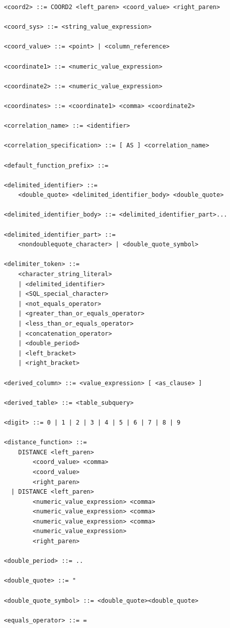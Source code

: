 \documentclass[11pt,a4paper]{ivoa}
\begin{document}
\begin{verbatim}
    <coord2> ::= COORD2 <left_paren> <coord_value> <right_paren>

    <coord_sys> ::= <string_value_expression>

    <coord_value> ::= <point> | <column_reference>

    <coordinate1> ::= <numeric_value_expression>

    <coordinate2> ::= <numeric_value_expression>

    <coordinates> ::= <coordinate1> <comma> <coordinate2>

    <correlation_name> ::= <identifier>

    <correlation_specification> ::= [ AS ] <correlation_name>

    <default_function_prefix> ::=

    <delimited_identifier> ::=
        <double_quote> <delimited_identifier_body> <double_quote>

    <delimited_identifier_body> ::= <delimited_identifier_part>...

    <delimited_identifier_part> ::=
        <nondoublequote_character> | <double_quote_symbol>

    <delimiter_token> ::=
        <character_string_literal>
        | <delimited_identifier>
        | <SQL_special_character>
        | <not_equals_operator>
        | <greater_than_or_equals_operator>
        | <less_than_or_equals_operator>
        | <concatenation_operator>
        | <double_period>
        | <left_bracket>
        | <right_bracket>

    <derived_column> ::= <value_expression> [ <as_clause> ]

    <derived_table> ::= <table_subquery>

    <digit> ::= 0 | 1 | 2 | 3 | 4 | 5 | 6 | 7 | 8 | 9

    <distance_function> ::=
        DISTANCE <left_paren>
            <coord_value> <comma>
            <coord_value>
            <right_paren>
      | DISTANCE <left_paren>
            <numeric_value_expression> <comma>
            <numeric_value_expression> <comma>
            <numeric_value_expression> <comma>
            <numeric_value_expression>
            <right_paren>

    <double_period> ::= ..

    <double_quote> ::= "

    <double_quote_symbol> ::= <double_quote><double_quote>

    <equals_operator> ::= =


\end{verbatim}
\end{document}
